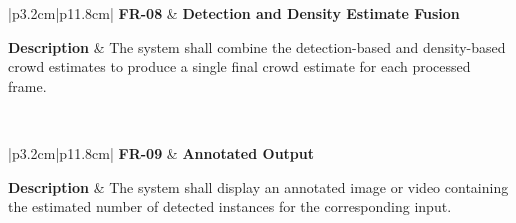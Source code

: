 
\begin{table}[H]
	\centering
	\renewcommand{\arraystretch}{1.25}
	\begin{tabular}{|p{3.2cm}|p{11.8cm}|}
		\hline
		\textbf{FR-08} &
		\textbf{Detection and Density Estimate Fusion} \\ \hline
		
		\textbf{Description} &
		The system shall combine the detection-based and density-based crowd estimates to produce a single final crowd estimate for each processed frame. \\ \hline
		
		 \\ \hline
	\end{tabular}
	\caption{Functional requirement for detection and density estimate fusion.}
	\label{tab:fr08}
\end{table}



\begin{table}[H]
	\centering
	\renewcommand{\arraystretch}{1.25}
	\begin{tabular}{|p{3.2cm}|p{11.8cm}|}
		\hline
		\textbf{FR-09} &
		\textbf{Annotated Output} \\ \hline
		
		\textbf{Description} &
		The system shall display an annotated image or video containing the estimated number of detected instances for the corresponding input. \\ \hline
		
		 \\ \hline
	\end{tabular}
	\caption{Functional requirement for annotated output.}
	\label{tab:fr09}
\end{table}


